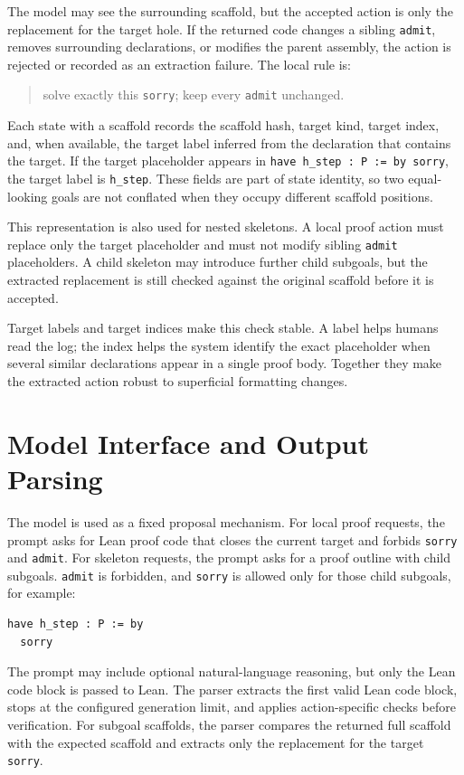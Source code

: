 \documentclass[en]{uet_awesome_thesis/uet-awesome-thesis}
\begin{document}
The model may see the surrounding scaffold, but the accepted action is only the replacement for the target hole. If the returned code changes a sibling \texttt{admit}, removes surrounding declarations, or modifies the parent assembly, the action is rejected or recorded as an extraction failure. The local rule is:
\begin{quote}
solve exactly this \texttt{sorry}; keep every \texttt{admit} unchanged.
\end{quote}

Each state with a scaffold records the scaffold hash, target kind, target index, and, when available, the target label inferred from the declaration that contains the target. If the target placeholder appears in \texttt{have h\_step : P := by sorry}, the target label is \texttt{h\_step}. These fields are part of state identity, so two equal-looking goals are not conflated when they occupy different scaffold positions.

This representation is also used for nested skeletons. A local proof action must replace only the target placeholder and must not modify sibling \texttt{admit} placeholders. A child skeleton may introduce further child subgoals, but the extracted replacement is still checked against the original scaffold before it is accepted.

Target labels and target indices make this check stable. A label helps humans read the log; the index helps the system identify the exact placeholder when several similar declarations appear in a single proof body. Together they make the extracted action robust to superficial formatting changes.

\section{Model Interface and Output Parsing}

The model is used as a fixed proposal mechanism. For local proof requests, the prompt asks for Lean proof code that closes the current target and forbids \texttt{sorry} and \texttt{admit}. For skeleton requests, the prompt asks for a proof outline with child subgoals. \texttt{admit} is forbidden, and \texttt{sorry} is allowed only for those child subgoals, for example:
\begin{verbatim}
have h_step : P := by
  sorry
\end{verbatim}

The prompt may include optional natural-language reasoning, but only the Lean code block is passed to Lean. The parser extracts the first valid Lean code block, stops at the configured generation limit, and applies action-specific checks before verification. For subgoal scaffolds, the parser compares the returned full scaffold with the expected scaffold and extracts only the replacement for the target \texttt{sorry}.
\end{document}
